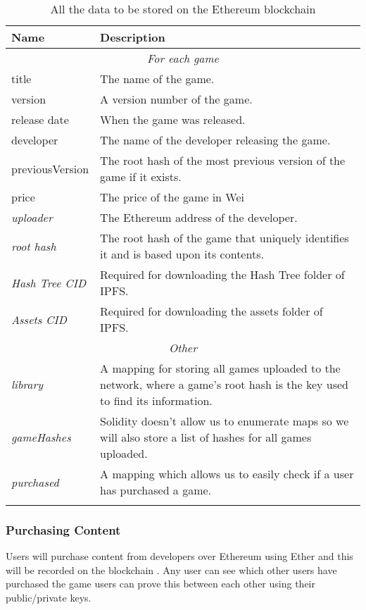\begin{longtable}{ p{} p{} }
  \toprule
  \textbf{Name} & \textbf{Description}
  \\\midrule\midrule
  \multicolumn{2}{c}{\cellcolor{red!70}\textit{For each game}} 
  \\\midrule
  title & The name of the game.\\
  version & A version number of the game.\\
  release date & When the game was released.\\
  developer & The name of the developer releasing the game.\\
  previousVersion & The root hash of the most previous version of the game if it exists.\\
  price & The price of the game in Wei\\
  \textit{uploader} & The Ethereum address of the developer.\\
  \textit{root hash} & The root hash of the game that uniquely identifies it and is based upon its contents.\\
  \textit{Hash Tree CID} & Required for downloading the Hash Tree folder of IPFS.\\
  \textit{Assets CID} & Required for downloading the assets folder of IPFS.\\\midrule
  \multicolumn{2}{c}{\cellcolor{green}\textit{Other}} 
  \\\midrule
  \textit{library} & A mapping for storing all games uploaded to the network, where a game's root hash is the key used to find its information.\\
  \textit{gameHashes} & Solidity doesn't allow us to enumerate maps so we will also store a list of hashes for all games uploaded.\\
  \textit{purchased} & A mapping which allows us to easily check if a user has purchased a game.
  \\\bottomrule\bottomrule
  \caption{All the data to be stored on the Ethereum blockchain}
\end{longtable}

\subsubsection*{Purchasing Content}

Users will purchase content from developers over Ethereum using Ether  and this will be recorded on the blockchain . Any user can see which other users have purchased the game users can prove this between each other using their public/private keys.